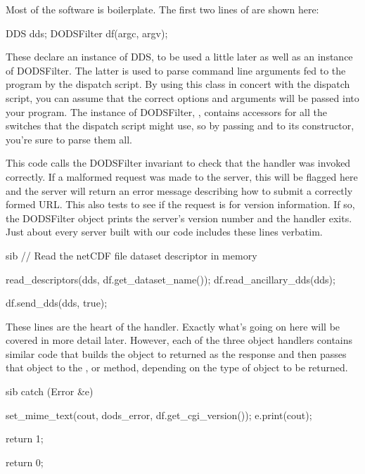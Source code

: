 \documentclass{dods-paper}
\begin{document}
Most of the software is boilerplate. The first two lines of
 are shown here:

\begin{vcode}
DDS dds;
DODSFilter df(argc, argv);
\end{vcode}

These declare an instance of DDS, to be used a little later as well as an
instance of DODSFilter. The latter is used to parse command line arguments
fed to the program by the dispatch script. By using this class in concert
with the dispatch script, you can assume that the correct options and
arguments will be passed into your program. The instance of DODSFilter,
, contains accessors for all the switches that the dispatch script
might use, so by passing  and  to its constructor, you're
sure to parse them all.

\begin{vcode}{sib}
try {
   if (!df.OK()) {
         df.print_usage();
         return 1
   }
   
   if (df.version()) {
         df.send_version_info();
         return 0;
   }
\end{vcode}  

This code calls the DODSFilter invariant to check that the handler was
invoked correctly. If a malformed request was made to the server, this
will be flagged here and the server will return an error message
describing how to submit a correctly formed URL. This also tests to
see if the request is for version information. If so, the
DODSFilter object prints the server's version number and the handler
exits. Just about every server built with our code includes these
lines verbatim.

\begin{vcode}{sib}  
   // Read the netCDF file dataset descriptor in memory

   read_descriptors(dds, df.get_dataset_name());
   df.read_ancillary_dds(dds);

   df.send_dds(dds, true);
\end{vcode}  
 
These lines are the heart of the handler. Exactly what's going on here
will be covered in more detail later. However, each of the three
object handlers contains similar code that builds the object to
returned as the response and then passes that object to the
,  or 
method, depending on the type of object to be returned.

\begin{vcode}{sib} 
   catch (Error &e) {
       set_mime_text(cout, dods_error, df.get_cgi_version());
       e.print(cout);

       return 1;
   }

   return 0;
\end{vcode}
  
\end{document}
